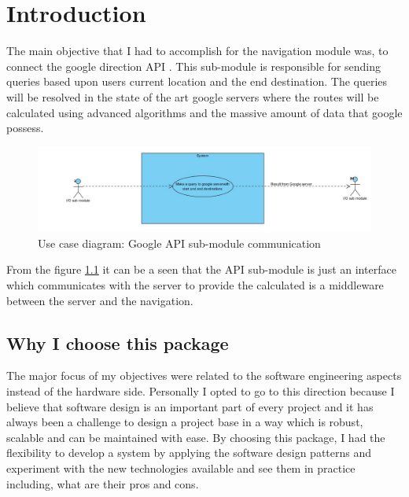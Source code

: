 \newpage
\chapter{Introduction}

	The main objective that I had to accomplish for the navigation module was, to connect the google direction API \cite{googleDirecAPI}. 
	This sub-module is responsible for sending queries based upon users current location and the end destination. 
	The queries will be resolved in the state of the art google servers where the 
	routes will be calculated using advanced algorithms and the massive amount of data that google possess. 

	\begin{figure}[htbp!]
		\centering \includegraphics[scale=0.7]{grafiken/googleServerCommunication.jpg}
		\caption{Use case diagram: Google API sub-module communication}
		\label{fig:Google API communication}
	\end{figure}

	\par
	From the figure \ref{fig:Google API communication} it can be a seen that the API sub-module is 
	just an interface which communicates with the server to provide the calculated is a 
	middleware between the server and the navigation. 
	
	\section{Why I choose this package}
	The major focus of my objectives were related to the software engineering aspects instead of
	the hardware side. Personally I opted to go to this direction because I believe that software
	design is an important part of every project and it has always been a challenge to design a project base
	in a way which is robust, scalable and can be maintained with ease. By choosing this package,
	I had the flexibility to develop a system by applying the software design patterns and experiment with 
	the new	technologies available and see them in practice including, what are their pros and cons. 
